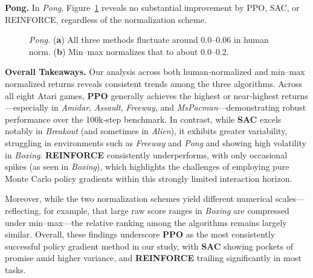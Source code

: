 \medskip

\noindent \textbf{Pong.} In \emph{Pong}, Figure~\ref{fig:pong_combined} reveals no substantial improvement by PPO, SAC, or REINFORCE, regardless of the normalization scheme.
\begin{figure} 
	\centering
	\quad
	\caption{\emph{Pong.}
		(\textbf{a}) All three methods fluctuate around 0.0--0.06 in human norm.
		(\textbf{b}) Min--max normalizes that to about 0.0--0.2.}
	\label{fig:pong_combined}
\end{figure}

\medskip

\noindent
\textbf{Overall Takeaways.}
Our analysis across both human‐normalized and min--max normalized returns reveals consistent trends among the three algorithms. Across all eight Atari games, \textbf{PPO} generally achieves the highest or near‐highest returns—especially in \emph{Amidar}, \emph{Assault}, \emph{Freeway}, and \emph{MsPacman}—demonstrating robust performance over the 100k‐step benchmark. In contrast, while \textbf{SAC} excels notably in \emph{Breakout} (and sometimes in \emph{Alien}), it exhibits greater variability, struggling in environments such as \emph{Freeway} and \emph{Pong} and showing high volatility in \emph{Boxing}. \textbf{REINFORCE} consistently underperforms, with only occasional spikes (as seen in \emph{Boxing}), which highlights the challenges of employing pure Monte Carlo policy gradients within this strongly limited interaction horizon.

Moreover, while the two normalization schemes yield different numerical scales—reflecting, for example, that large raw score ranges in \emph{Boxing} are compressed under min--max—the relative ranking among the algorithms remains largely similar. Overall, these findings underscore \textbf{PPO} as the most consistently successful policy gradient method in our study, with \textbf{SAC} showing pockets of promise amid higher variance, and \textbf{REINFORCE} trailing significantly in most tasks.

